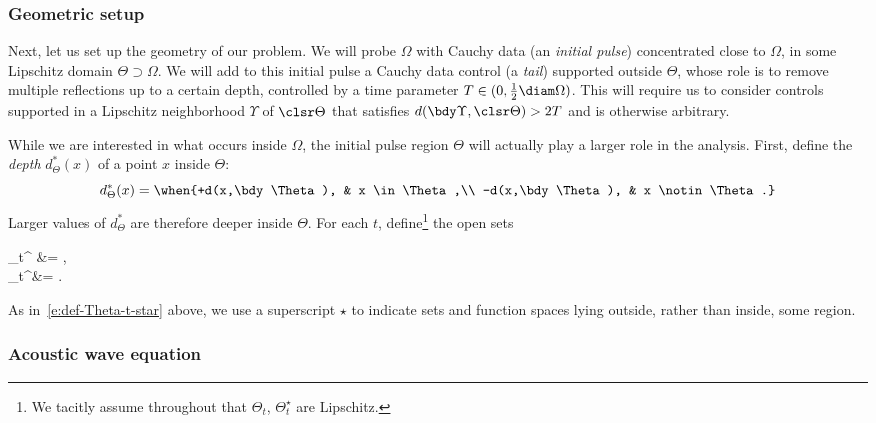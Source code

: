 \documentclass[10pt]{article}
\theoremstyle{plain}
\theoremstyle{definition}
\theoremstyle{remark}
\numberwithin{theorem}{section}
\numberwithin{example}{section}
\numberwithin{equation}{section}
\numberwithin{figure}{section}
\begin{document}
\subsubsection{Geometric setup}							\label{s:geometric-setup}


Next, let us set up the geometry of our problem.
We will probe $\Omega$ with Cauchy data (an \emph{initial pulse}) concentrated close to $\Omega$, in some Lipschitz domain $\Theta\supset\Omega$. We will add to this initial pulse a Cauchy data control (a \emph{tail}) supported outside $\Theta$, whose role is to remove multiple reflections up to a certain depth, controlled by a time parameter $T\in (0,\frac12\diam\Omega)$. This will require us to consider controls supported in a Lipschitz neighborhood $\Upsilon$ of $\clsr\Theta$ that satisfies $d(\bdy\Upsilon,\clsr\Theta)>2T$ and is otherwise arbitrary.

While we are interested in what occurs inside $\Omega$, the initial pulse region $\Theta$ will actually play a larger role in the analysis. First, define the \emph{depth} $d^*_\Theta(x)$ of a point $x$ inside $\Theta$:
%
%
\begin{equation}
	d^*_\Theta(x) = \when{+d(x,\bdy\Theta),		& x \in \Theta,\\
					  -d(x,\bdy\Theta),			& x \notin \Theta.}
													\label{e:exact-depth}
\end{equation}
%
%
Larger values of $d^*_\Theta$ are therefore deeper inside $\Theta$. For each $t$, define\footnote{We tacitly assume throughout that $\Theta_t$, $\Theta_t^\star$ are Lipschitz.} the open sets
%
%
\begin{nalign}
	\Theta_t^{\phantom\star} &= \!,\\
	\Theta_t^\star &= \!.
													\label{e:def-Theta-t-star}
\end{nalign}
%
%
As in~\eqref{e:def-Theta-t-star} above, we use a superscript $\star$ to indicate sets and function spaces lying outside, rather than inside, some region.


\subsubsection{Acoustic wave equation}					\label{s:wave-setup}
\end{document}

